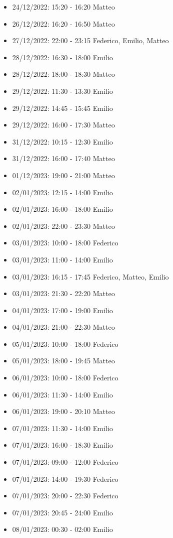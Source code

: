 \begin{itemize}
    \item 24/12/2022: 15:20 - 16:20 Matteo
    \item 26/12/2022: 16:20 - 16:50 Matteo
    \item 27/12/2022: 22:00 - 23:15 Federico, Emilio, Matteo
    \item 28/12/2022: 16:30 - 18:00 Emilio
    \item 28/12/2022: 18:00 - 18:30 Matteo
    \item 29/12/2022: 11:30 - 13:30 Emilio
    \item 29/12/2022: 14:45 - 15:45 Emilio
    \item 29/12/2022: 16:00 - 17:30 Matteo
    \item 31/12/2022: 10:15 - 12:30 Emilio
    \item 31/12/2022: 16:00 - 17:40 Matteo
    \item 01/12/2023: 19:00 - 21:00 Matteo
    \item 02/01/2023: 12:15 - 14:00 Emilio
    \item 02/01/2023: 16:00 - 18:00 Emilio
    \item 02/01/2023: 22:00 - 23:30 Matteo
    \item 03/01/2023: 10:00 - 18:00 Federico
    \item 03/01/2023: 11:00 - 14:00 Emilio
    \item 03/01/2023: 16:15 - 17:45 Federico, Matteo, Emilio
    \item 03/01/2023: 21:30 - 22:20 Matteo
    \item 04/01/2023: 17:00 - 19:00 Emilio
    \item 04/01/2023: 21:00 - 22:30 Matteo
    \item 05/01/2023: 10:00 - 18:00 Federico
    \item 05/01/2023: 18:00 - 19:45 Matteo
    \item 06/01/2023: 10:00 - 18:00 Federico
    \item 06/01/2023: 11:30 - 14:00 Emilio
    \item 06/01/2023: 19:00 - 20:10 Matteo
    \item 07/01/2023: 11:30 - 14:00 Emilio
    \item 07/01/2023: 16:00 - 18:30 Emilio
    \item 07/01/2023: 09:00 - 12:00 Federico
    \item 07/01/2023: 14:00 - 19:30 Federico
    \item 07/01/2023: 20:00 - 22:30 Federico
    \item 07/01/2023: 20:45 - 24:00 Emilio
    \item 08/01/2023: 00:30 - 02:00 Emilio
\end{itemize}
\clearpage